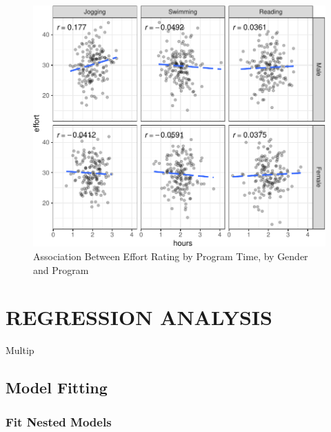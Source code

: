 \documentclass[
]{article}
\begin{document}
\begin{figure}[hb]

\includegraphics{Appendix_ex_weightloss_files/figure-latex/unnamed-chunk-67-1} \hfill{}

\caption{Association Between Effort Rating by Program Time, by Gender and Program}\label{fig:unnamed-chunk-67}
\end{figure}

\clearpage

\hypertarget{regression-analysis}{%
\section{REGRESSION ANALYSIS}\label{regression-analysis}}

Multip

\hypertarget{model-fitting}{%
\subsection{Model Fitting}\label{model-fitting}}

\hypertarget{fit-nested-models}{%
\subsubsection{Fit Nested Models}\label{fit-nested-models}}
\end{document}
